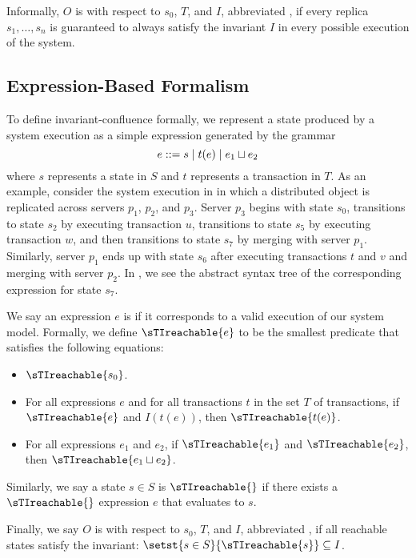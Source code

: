 Informally, $O$ is  with respect to $s_0$, $T$, and
$I$, abbreviated , if every replica $s_1, \ldots, s_n$
is guaranteed to always satisfy the invariant $I$ in every possible execution
of the system.

\subsection{Expression-Based Formalism}
To define invariant-confluence formally, we represent a state produced by a
system execution as a simple expression generated by the grammar
\[
  e ::= s \mid t(e) \mid e_1 \sqcup e_2
\]
where $s$ represents a state in $S$ and $t$ represents a transaction in $T$. As
an example, consider the system execution in  in which
a distributed object is replicated across servers $p_1$, $p_2$, and $p_3$.
Server $p_3$ begins with state $s_0$, transitions to state $s_2$ by executing
transaction $u$, transitions to state $s_5$ by executing transaction $w$, and
then transitions to state $s_7$ by merging with server $p_1$. Similarly, server
$p_1$ ends up with state $s_6$ after executing transactions $t$ and $v$ and
merging with server $p_2$. In , we see the abstract syntax
tree of the corresponding expression for state $s_7$.

{}

We say an expression $e$ is  if it corresponds to a
valid execution of our system model. Formally, we define $\sTIreachable{e}$ to
be the smallest predicate that satisfies the following equations:
\begin{itemize}
  \item
    $\sTIreachable{s_0}$.
  \item
    For all expressions $e$ and for all transactions $t$ in the set $T$ of
    transactions, if $\sTIreachable{e}$ and $I(t(e))$, then
    $\sTIreachable{t(e)}$.
  \item
    For all expressions $e_1$ and $e_2$, if $\sTIreachable{e_1}$ and
    $\sTIreachable{e_2}$, then $\sTIreachable{e_1 \join e_2}$.
\end{itemize}
Similarly, we say a state $s \in S$ is $\sTIreachable{}$ if there exists a
$\sTIreachable{}$ expression $e$ that evaluates to $s$.

Finally, we say $O$ is  with respect to $s_0$,
$T$, and $I$, abbreviated , if all reachable states
satisfy the invariant: $\setst{s \in S}{\sTIreachable{s}} \subseteq I$.
